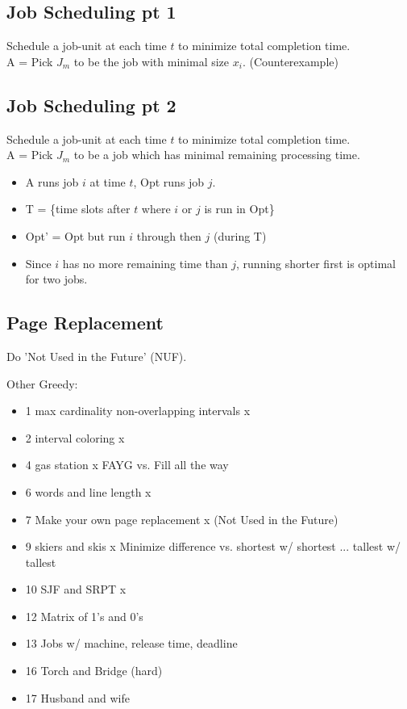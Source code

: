 \documentclass[12pt]{article}
\providecommand{\tightlist}{
    \setlength{\itemsep}{0pt}\setlength{\parskip}{0pt}
}
\begin{document}
\subsection{Job Scheduling pt 1}
Schedule a job-unit at each time $t$ to minimize total completion time.\\
A = Pick $J_m$ to be the job with minimal size $x_i$.
(Counterexample)

\subsection{Job Scheduling pt 2}
Schedule a job-unit at each time $t$ to minimize total completion time.\\
A = Pick $J_m$ to be a job which has minimal remaining processing time.
\begin{itemize}\tightlist
  \item A runs job $i$ at time $t$, Opt runs job $j$.
  \item T = \{time slots after $t$ where $i$ or $j$ is run in Opt\}
  \item Opt' = Opt but run $i$ through then $j$ (during T)
  \item Since $i$ has no more remaining time than $j$, running shorter first is optimal for two jobs.
\end{itemize}


\subsection{Page Replacement}
Do 'Not Used in the Future' (NUF).



Other Greedy:
\begin{itemize}
  \item 1 max cardinality non-overlapping intervals   x
  \item 2 interval coloring                           x
  \item 4 gas station                                 x
          FAYG vs. Fill all the way
  \item 6 words and line length                       x
  \item 7 Make your own page replacement              x
          (Not Used in the Future)
  \item 9 skiers and skis                             x
          Minimize difference vs. shortest w/ shortest ... tallest w/ tallest
  \item 10 SJF and SRPT                               x
  \item 12 Matrix of 1's and 0's
  \item 13 Jobs w/ machine, release time, deadline
  \item 16 Torch and Bridge (hard)
  \item 17 Husband and wife
\end{itemize}
\end{document}
